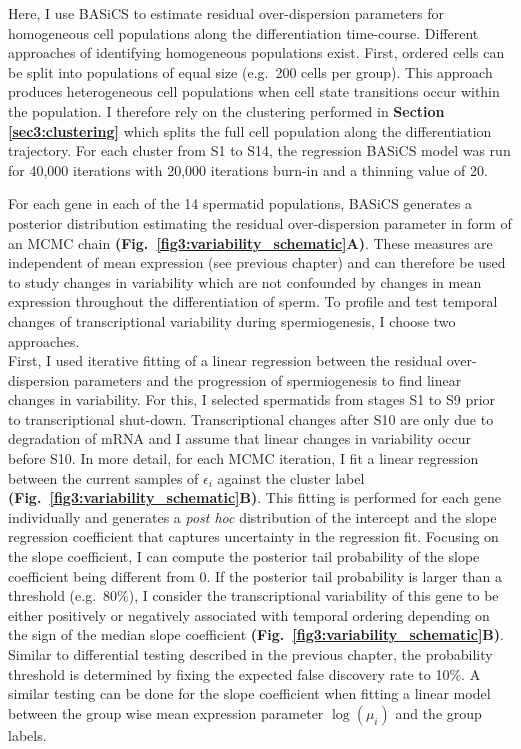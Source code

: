 Here, I use BASiCS to estimate residual over-dispersion parameters for homogeneous cell populations along the differentiation time-course. Different approaches of identifying homogeneous populations exist. First, ordered cells can be split into populations of equal size (e.g.~200 cells per group). This approach produces heterogeneous cell populations when cell state transitions occur within the population. I therefore rely on the clustering performed in \textbf{Section \ref{sec3:clustering}} which splits the full cell population along the differentiation trajectory. For each cluster from S1 to S14, the regression BASiCS model was run for 40,000 iterations with 20,000 iterations burn-in and a thinning value of 20. 

\newpage

For each gene in each of the 14 spermatid populations, BASiCS generates a posterior distribution estimating the residual over-dispersion parameter in form of an MCMC chain \textbf{(Fig.~\ref{fig3:variability_schematic}A)}. These measures are independent of mean expression (see previous chapter) and can therefore be used to study changes in variability which are not confounded by changes in mean expression throughout the differentiation of sperm. To profile and test temporal changes of transcriptional variability during spermiogenesis, I choose two approaches. \\

First, I used iterative fitting of a linear regression between the residual over-dispersion parameters and the progression of spermiogenesis to find linear changes in variability. For this, I selected spermatids from stages S1 to S9 prior to transcriptional shut-down. Transcriptional changes after S10 are only due to degradation of mRNA and I assume that linear changes in variability occur before S10. In more detail, for each MCMC iteration, I fit a linear regression between the current samples of $\epsilon_i$ against the cluster label \textbf{(Fig.~\ref{fig3:variability_schematic}B)}. This fitting is performed for each gene individually and generates a \emph{post hoc} distribution of the intercept and the slope regression coefficient that captures uncertainty in the regression fit. Focusing on the slope coefficient, I can compute the posterior tail probability of the slope coefficient being different from 0. If the posterior tail probability is larger than a threshold (e.g.~80\%), I consider the transcriptional variability of this gene to be either positively or negatively associated with temporal ordering depending on the sign of the median slope coefficient \textbf{(Fig.~\ref{fig3:variability_schematic}B)}. Similar to differential testing described in the previous chapter, the probability threshold is determined by fixing the expected false discovery rate to 10\%. A similar testing can be done for the slope coefficient when fitting a linear model between the group wise mean expression parameter $\log(\mu_i)$ and the group labels.\\

